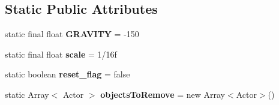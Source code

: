 \subsection*{Static Public Attributes}
\begin{DoxyCompactItemize}
\item 
\mbox{\label{classnl_1_1arjanfrans_1_1mario_1_1model_1_1World_a48cc806be51479e40d1a4715e1eef234}} 
static final float {\bfseries G\+R\+A\+V\+I\+TY} = -\/150
\item 
\mbox{\label{classnl_1_1arjanfrans_1_1mario_1_1model_1_1World_a46cf4f8f487ef4de0c8e812d81d94a07}} 
static final float {\bfseries scale} = 1/16f
\item 
\mbox{\label{classnl_1_1arjanfrans_1_1mario_1_1model_1_1World_a03d5af92c1c20e4b1d99c2a93b0654f0}} 
static boolean {\bfseries reset\+\_\+flag} = false
\item 
\mbox{\label{classnl_1_1arjanfrans_1_1mario_1_1model_1_1World_a583d7ea2ce8e985489255cab5e40a035}} 
static Array$<$ Actor $>$ {\bfseries objects\+To\+Remove} = new Array$<$Actor$>$()
\end{DoxyCompactItemize}
